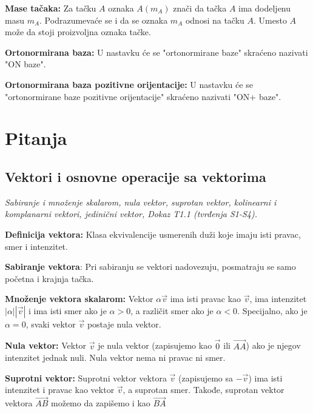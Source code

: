 \documentclass[12pt]{article}
\newcommand{\vek}[1]{\overrightarrow{#1}}
\begin{document}
\par

\textbf{Mase tačaka:} Za tačku $A$ oznaka $A(m_A)$ znači da tačka $A$ ima
dodeljenu masu $m_A$. Podrazumevaće se i da se oznaka $m_A$ odnosi na tačku
$A$. Umesto $A$ može da stoji proizvoljna oznaka tačke.

\par

\textbf{Ortonormirana baza:} U nastavku će se "ortonormirane baze" skraćeno
nazivati "ON baze".

\par

\textbf{Ortonormirana baza pozitivne orijentacije:} U nastavku će se
"ortonormirane baze pozitivne orijentacije" skraćeno nazivati "ON+ baze".

\newpage

\section{Pitanja}
\subsection{Vektori i osnovne operacije sa vektorima}
\textit{Sabiranje i množenje skalarom, nula vektor, suprotan vektor, kolinearni
    i komplanarni vektori, jedinični vektor, Dokaz T1.1 (tvrđenja S1-S4).}
\par
\vspace*{1cm}

\textbf{Definicija vektora:} Klasa ekvivalencije usmerenih duži koje imaju isti
pravac, smer i intenzitet.
\par

\textbf{Sabiranje vektora}: Pri sabiranju se vektori nadovezuju, posmatraju se
samo početna i krajnja tačka.
\par

\textbf{Množenje vektora skalarom:} Vektor $\alpha\vek{v}$ ima isti pravac
kao $\vek{v}$, ima intenzitet $|\alpha||\vek{v}|$ i ima isti smer ako je
$\alpha>0$, a različit smer ako je $\alpha<0$. Specijalno, ako je $\alpha=0$,
svaki vektor $\vek{v}$ postaje nula vektor.
\par

\textbf{Nula vektor:} Vektor $\vek{v}$ je nula vektor (zapisujemo kao $\vek{0}$
ili $\vek{AA}$) ako je njegov intenzitet jednak nuli. Nula vektor nema ni
pravac ni smer.
\par

\textbf{Suprotni vektor:} Suprotni vektor vektora $\vek{v}$ (zapisujemo sa
$-\vek{v}$) ima isti intenzitet i pravac kao vektor $\vek{v}$, a suprotan smer.
Takođe, suprotan vektor vektora $\vek{AB}$ možemo da zapišemo i kao $\vek{BA}$
\par
\end{document}
